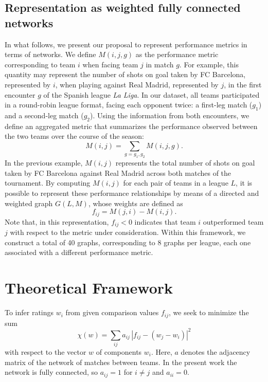 \documentclass[preprint, amsmath,amssymb, pre]{revtex4-2}
\begin{document}
\subsection{Representation as weighted fully connected networks}

In what follows, we present our proposal to represent performance metrics in terms of networks.  
We define $M(i,j,g)$ as the performance metric corresponding to team $i$ when facing team $j$ in match $g$. For example, this quantity may represent the number of shots on goal taken by FC Barcelona, represented by $i$, when playing against Real Madrid, represented by $j$, in the first encounter $g$ of the Spanish league {\it La Liga}.  
%
In our dataset, all teams participated in a round-robin league format, facing each opponent twice: a first-leg match ($g_1$) and a second-leg match ($g_2$). Using the information from both encounters, we define an aggregated metric that summarizes the performance observed between the two teams over the course of the season:
%
$$
M(i,j) = \sum_{g= g_1, g_2} M(i,j,g).
$$
%
In the previous example, $M(i,j)$ represents the total number of shots on goal taken by FC Barcelona against Real Madrid across both matches of the tournament.
%
By computing $M(i,j)$ for each pair of teams in a league $L$, it is possible to represent these performance relationships by means of a directed and weighted graph $G(L,M)$, whose weights are defined as
%
$$
f_{ij} = M(j,i) - M(i,j).
$$
%
Note that, in this representation, $f_{ij} < 0$ indicates that team $i$ outperformed team $j$ with respect to the metric under consideration.
%
Within this framework, we construct a total of 40 graphs, corresponding to 8 graphs per league, each one associated with a different performance metric.




\section{Theoretical Framework}
\label{se:theory}

To infer ratings $w_i$ from given comparison values $f_{ij}$, we seek to minimize the sum
$$
\chi(w)
=
\sum_{ij}
a_{ij}\,
|f_{ij}-(w_j-w_i)|^2
$$
with respect to the vector $w$ of components $w_i$.
Here, $a$ denotes the adjacency matrix of the network of matches between teams.
In the present work the network is fully connected, so $a_{ij}=1$ for $i\neq j$ and $a_{ii}=0$.
\end{document}
